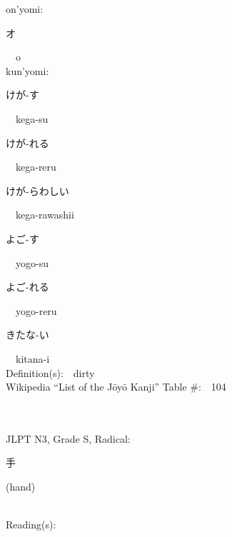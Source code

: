 \begin{multicols}{2}
{\hspace*{1em}}on'yomi:\ \ \\
{\hspace*{2em}}{\begin{CJK}{UTF8}{min} オ \end{CJK}}\ \ o\ \ \\
{\hspace*{1em}}kun'yomi:\ \ \\
{\hspace*{2em}}{\begin{CJK}{UTF8}{min} けが-す \end{CJK}}\ \ kega-su\ \ \\
{\hspace*{2em}}{\begin{CJK}{UTF8}{min} けが-れる \end{CJK}}\ \ kega-reru\ \ \\
{\hspace*{2em}}{\begin{CJK}{UTF8}{min} けが-らわしい \end{CJK}}\ \ kega-rawashii\ \ \\
{\hspace*{2em}}{\begin{CJK}{UTF8}{min} よご-す \end{CJK}}\ \ yogo-su\ \ \\
{\hspace*{2em}}{\begin{CJK}{UTF8}{min} よご-れる \end{CJK}}\ \ yogo-reru\ \ \\
{\hspace*{2em}}{\begin{CJK}{UTF8}{min} きたな-い \end{CJK}}\ \ kitana-i\ \ \\
Definition(s):\ \ dirty \\
Wikipedia ``List of the J\=oy\=o Kanji'' Table \#:\ \ 104 \\
\ \ \\
{\fontsize{34pt}{40pt}  }\ \ \\  %
{JLPT N3, Grade S, Radical:\ \ {\begin{CJK}{UTF8}{min} 手 \end{CJK}} (hand) } \\
Reading(s):\ \ \\

\end{multicols}
